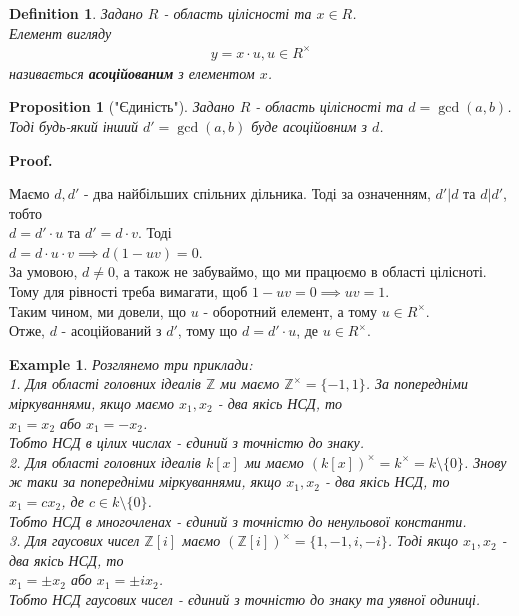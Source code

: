 \documentclass[a4paper, 10pt]{article}
\makeatletter
\theoremstyle{theoremdd}
\theoremstyle{theoremdd}
\newtheorem{definition}[theorem]{Definition}
\theoremstyle{theoremdd}
\theoremstyle{theoremdd}
\newtheorem{example}[theorem]{Example}
\theoremstyle{theoremdd}
\newtheorem{proposition}[theorem]{Proposition}
\theoremstyle{theoremdd}
\theoremstyle{theoremdd}
\theoremstyle{theoremdd}
\renewenvironment{proof}[1][Proof.\\]{\par
\pushQED{\hfill \qed}%
\normalfont \topsep6\p@\@plus6\p@\relax
\trivlist
\item\relax
{\bfseries
#1\@addpunct{.}}\hspace\labelsep\ignorespaces
}{%
\popQED\endtrivlist\@endpefalse
}
\makeatother
\begin{document}
\begin{definition}
Задано $R$ - область цілісності та $x \in R$.\\
Елемент вигляду
\begin{align*}
y = x \cdot u, u \in R^\times
\end{align*}
називається \textbf{асоційованим} з елементом $x$.
\end{definition}



\begin{proposition}["Єдиність"]
Задано $R$ - область цілісності та $d = \gcd(a,b)$.\\
Тоді будь-який інший $d' = \gcd(a,b)$ буде асоційовним з $d$.
\end{proposition}

\begin{proof}
Маємо $d,d'$ - два найбільших спільних дільника. Тоді за означенням, $d' | d$ та $d | d'$, тобто\\
$d = d' \cdot u$ та $d' = d \cdot v$. Тоді\\
$d = d \cdot u \cdot v \implies d(1-uv) = 0$.\\
За умовою, $d \neq 0$, а також не забуваймо, що ми працюємо в області цілісноті. Тому для рівності треба вимагати, щоб $1 - uv = 0 \implies uv = 1$.\\
Таким чином, ми довели, що $u$ - оборотний елемент, а тому $u \in R^\times$.\\
Отже, $d$ - асоційований з $d'$, тому що $d = d' \cdot u$, де $u \in R^\times$.
\end{proof}

\begin{example} Розглянемо три приклади:\\
1. Для області головних ідеалів $\mathbb{Z}$ ми маємо $\mathbb{Z}^\times = \{-1,1\}$. За попередніми міркуваннями, якщо маємо $x_1,x_2$ - два якісь НСД, то\\
$x_1 = x_2$ або $x_1 = -x_2$.\\
Тобто НСД в цілих числах - єдиний з точністю до знаку.
\bigskip \\
2. Для області головних ідеалів $k[x]$ ми маємо $(k[x])^\times = k^\times = k \setminus \{0\}$. Знову ж таки за попередніми міркуваннями, якщо $x_1,x_2$ - два якісь НСД, то\\
$x_1 = c x_2$, де $c \in k \setminus \{0\}$.\\
Тобто НСД в многочленах - єдиний з точністю до ненульової константи.
\bigskip \\
3. Для гаусових чисел $\mathbb{Z}[i]$ маємо $(\mathbb{Z}[i])^\times = \{1,-1,i,-i\}$. Тоді якщо $x_1,x_2$ - два якісь НСД, то\\
$x_1 = \pm x_2$ або $x_1 = \pm ix_2$.\\
Тобто НСД гаусових чисел - єдиний з точністю до знаку та уявної одиниці.
\end{example}
\end{document}
